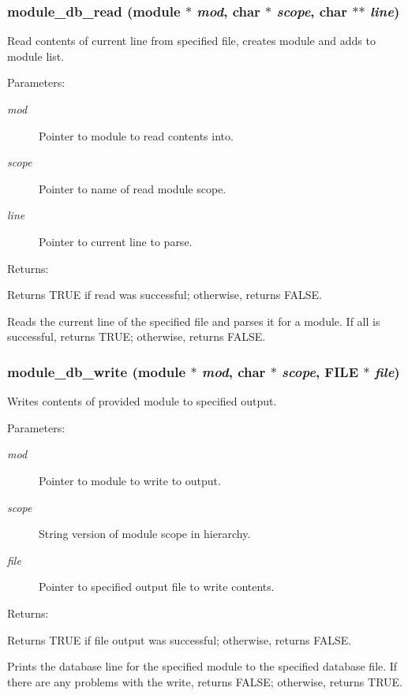 \subsubsection{ module\_\-db\_\-read ({\bf module} $\ast$ {\em mod}, char $\ast$ {\em scope}, char $\ast$$\ast$ {\em line})}\label{module_8c_a3}


Read contents of current line from specified file, creates module and adds to module list.

\begin{Desc}
\item[Parameters: ]\par
\begin{description}
\item[{\em 
mod}]Pointer to module to read contents into. \item[{\em 
scope}]Pointer to name of read module scope. \item[{\em 
line}]Pointer to current line to parse.\end{description}
\end{Desc}
\begin{Desc}
\item[Returns: ]\par
Returns TRUE if read was successful; otherwise, returns FALSE.\end{Desc}
Reads the current line of the specified file and parses it for a module. If all is successful, returns TRUE; otherwise, returns FALSE. 
\subsubsection{ module\_\-db\_\-write ({\bf module} $\ast$ {\em mod}, char $\ast$ {\em scope}, FILE $\ast$ {\em file})}\label{module_8c_a2}


Writes contents of provided module to specified output.

\begin{Desc}
\item[Parameters: ]\par
\begin{description}
\item[{\em 
mod}]Pointer to module to write to output. \item[{\em 
scope}]String version of module scope in hierarchy. \item[{\em 
file}]Pointer to specified output file to write contents. \end{description}
\end{Desc}
\begin{Desc}
\item[Returns: ]\par
Returns TRUE if file output was successful; otherwise, returns FALSE.\end{Desc}
Prints the database line for the specified module to the specified database file. If there are any problems with the write, returns FALSE; otherwise, returns TRUE. 
